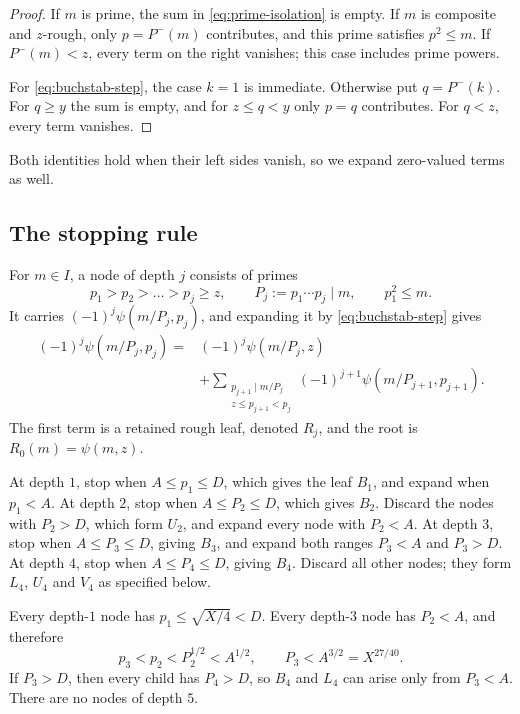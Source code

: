 \documentclass{amsart}
\numberwithin{equation}{section}
\numberwithin{table}{section}
\begin{document}
\begin{proof}
If $m$ is prime, the sum in \eqref{eq:prime-isolation} is empty.
If $m$ is composite and $z$-rough, only $p=P^-(m)$ contributes, and this
prime satisfies $p^2\le m$. If $P^-(m)<z$, every term on the right
vanishes; this case includes prime powers.

For \eqref{eq:buchstab-step}, the case $k=1$ is immediate.
Otherwise put $q=P^-(k)$. For $q\ge y$ the sum is empty, and for
$z\le q<y$ only $p=q$ contributes. For $q<z$, every term vanishes.
\end{proof}

Both identities hold when their left sides vanish, so we expand
zero-valued terms as well.

\subsection{The stopping rule}

For $m\in I$, a node of depth $j$ consists of primes
\[
p_1>p_2>\dots>p_j\ge z,\qquad
P_j:=p_1\cdots p_j\mid m,\qquad p_1^2\le m.
\]
It carries $(-1)^j\psi(m/P_j,p_j)$, and expanding it by \eqref{eq:buchstab-step} gives
\begin{equation}\label{eq:node-expansion}
\begin{split}
(-1)^j\psi(m/P_j,p_j)
={}&(-1)^j\psi(m/P_j,z)\\
&+\sum_{\substack{p_{j+1}\mid m/P_j\\z\le p_{j+1}<p_j}}
(-1)^{j+1}\psi(m/P_{j+1},p_{j+1}).
\end{split}
\end{equation}
The first term is a retained rough leaf, denoted $R_j$, and the root is
$R_0(m)=\psi(m,z)$.

At depth $1$, stop when $A\le p_1\le D$, which gives the leaf $B_1$, and
expand when $p_1<A$.
At depth $2$, stop when $A\le P_2\le D$, which gives $B_2$.
Discard the nodes with $P_2>D$, which form $U_2$, and expand every node
with $P_2<A$.
At depth $3$, stop when $A\le P_3\le D$, giving $B_3$, and expand both
ranges $P_3<A$ and $P_3>D$.
At depth $4$, stop when $A\le P_4\le D$, giving $B_4$.
Discard all other nodes; they form $L_4$, $U_4$ and $V_4$ as specified
below.

Every depth-$1$ node has $p_1\le\sqrt{X/4}<D$.
Every depth-$3$ node has $P_2<A$, and therefore
\begin{equation}\label{eq:third-prime}
p_3<p_2<P_2^{1/2}<A^{1/2},\qquad P_3<A^{3/2}=X^{27/40}.
\end{equation}
If $P_3>D$, then every child has $P_4>D$, so $B_4$ and $L_4$ can arise
only from $P_3<A$. There are no nodes of depth $5$.
\end{document}
